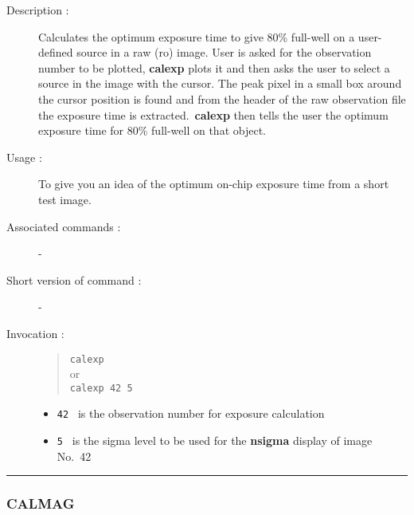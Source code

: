 \begin{description}

\item[Description :] Calculates the optimum exposure time to give 80\%
full-well on a user-defined source in a raw ({\sc ro}) image.  User is asked
for the observation number to be plotted, {\bf calexp} plots it and
then asks the user to select a source in the image with the cursor.
The peak pixel in a small box around the cursor position is found and
from the header of the raw observation file the exposure time is
extracted.\ {\bf calexp} then tells the user the optimum exposure time
for 80\% full-well on that object.

\item[Usage :] To give you an idea of the optimum on-chip exposure
time from a short test image.

\item[Associated commands :] -
\item[Short version of command :] -
\item[Invocation :]

\begin{quote}{\tt  calexp } \\
or \\
{\tt calexp 42 5 }
\end{quote}

\begin{itemize}

\item {\tt 42 } is the observation number for exposure calculation
\item {\tt 5 } is the sigma level to be used for the {\bf nsigma} display of
image No.\ 42

\end{itemize}

\end{description}

\hrule
\subsubsection*{\label{CALMAG}CALMAG}

